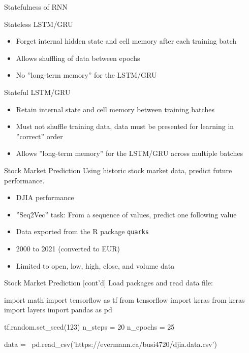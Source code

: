 \documentclass[ignorenonframetext,xcolor=x11names]{beamer}
\begin{document}
\begin{frame}{Statefulness of RNN}
\small
\begin{block}{Stateless LSTM/GRU}
\begin{itemize}
   \item Forget internal hidden state and cell memory after each training batch
   \item Allows shuffling of data between epochs
   \item No ''long-term memory'' for the LSTM/GRU
\end{itemize}
\end{block}
\begin{block}{Stateful LSTM/GRU}
\begin{itemize}
   \item Retain internal state and cell memory between training batches
   \item Must not shuffle training data, data must be presented for learning in ''correct'' order
   \item Allows ''long-term memory'' for the LSTM/GRU across multiple batches
\end{itemize}
\end{block}
\end{frame}

\begin{frame}[fragile]{Stock Market Prediction}
Using historic stock market data, predict future performance.
\begin{itemize}
   \item DJIA performance
   \item ''Seq2Vec'' task: From a sequence of values, predict one following value
   \item Data exported from the R package \texttt{quarks}
   \item 2000 to 2021 (converted to EUR)
   \item Limited to open, low, high, close, and volume data
\end{itemize}
\end{frame}

\begin{frame}[fragile]{Stock Market Prediction \small [cont'd]}
Load packages and read data file:
\begin{pythoncode}
import math
import tensorflow as tf
from tensorflow import keras
from keras import layers
import pandas as pd

tf.random.set_seed(123)
n_steps = 20
n_epochs = 25

data = \
pd.read_csv('https://evermann.ca/busi4720/djia.data.csv')
\end{pythoncode}
\end{frame}
\end{document}
